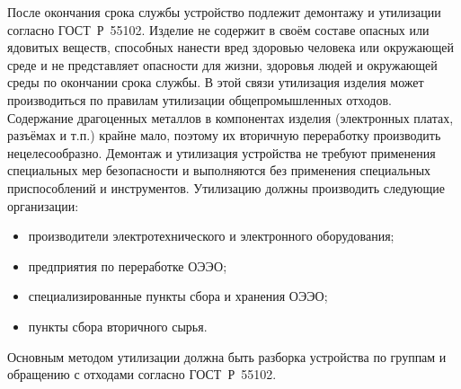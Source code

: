 \color{black}

После  окончания  срока  службы  устройство  подлежит  демонтажу  и  утилизации  согласно ГОСТ~Р~55102. Изделие не содержит в своём составе опасных или ядовитых веществ, способных нанести вред здоровью человека или окружающей среде и не представляет опасности для жизни, здоровья людей 
и окружающей среды по окончании срока службы. В этой связи утилизация изделия может производиться по правилам утилизации общепромышленных отходов. 
Содержание драгоценных металлов в компонентах изделия (электронных платах, разъёмах и т.п.) крайне мало, поэтому их вторичную переработку производить нецелесообразно. Демонтаж  и  утилизация  устройства  не  требуют  применения  специальных  мер  безопасности  и выполняются без применения специальных приспособлений и инструментов. Утилизацию должны производить следующие организации:
\begin{itemize} 
\item производители электротехнического и электронного оборудования; 
\item предприятия по переработке ОЭЭО; 
\item специализированные пункты сбора и хранения ОЭЭО; 
\item пункты сбора вторичного сырья.
\end{itemize} 
Основным  методом  утилизации  должна  быть  разборка  устройства  по  группам  и  обращению  с отходами согласно ГОСТ~Р~55102. 